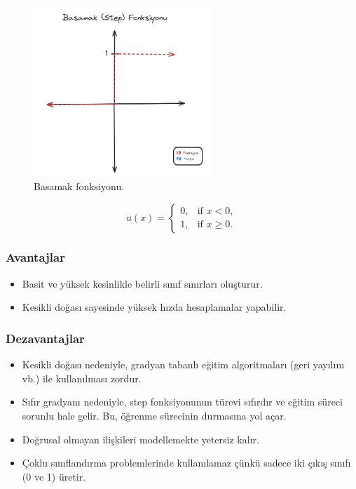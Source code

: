 \begin{figure}[h]
    \centering
    \includegraphics[width=0.6\textwidth]{images/step_function.png}
    \caption{Basamak fonksiyonu.}
    \label{fig:enter-label}
\end{figure}

\[u(x) = \begin{cases} 
0, & \text{if } x < 0, \\ 
1, & \text{if } x \geq 0. 
\end{cases}\]

\subsubsection{Avantajlar}
\begin{itemize}
    \item Basit ve yüksek kesinlikle belirli sınıf sınırları oluşturur.
    \item Kesikli doğası sayesinde yüksek hızda hesaplamalar yapabilir. 
\end{itemize}

\subsubsection{Dezavantajlar}
\begin{itemize}
    \item Kesikli doğası nedeniyle, gradyan tabanlı eğitim algoritmaları (geri yayılım vb.) ile kullanılması zordur.
    \item Sıfır gradyanı nedeniyle, step fonksiyonunun türevi sıfırdır ve eğitim süreci sorunlu hale gelir. Bu, öğrenme sürecinin durmasına yol açar.
    \item Doğrusal olmayan ilişkileri modellemekte yetersiz kalır.
    \item Çoklu sınıflandırma problemlerinde kullanılamaz çünkü sadece iki çıkış sınıfı (0 ve 1) üretir.
\end{itemize}

